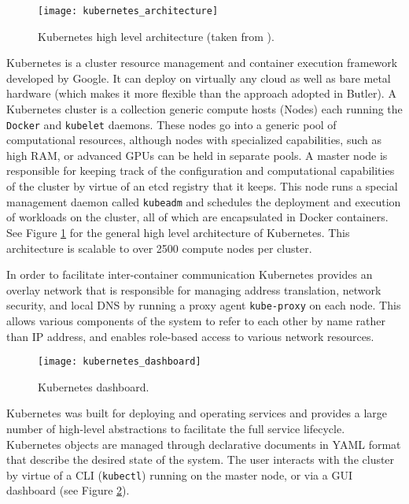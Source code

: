 \begin{figure}[H]
    \texttt{[image: kubernetes\_architecture]}
    \centering
    \caption {Kubernetes high level architecture (taken from \autocite{kubedoc}).}
    \label{fig:kubernetes_architecture}
\end{figure}

Kubernetes is a cluster resource management and container execution framework developed by Google. It can deploy on virtually any cloud as well as bare metal hardware (which makes it more flexible than the approach adopted in Butler). A Kubernetes cluster is a collection generic compute hosts (Nodes) each running the \texttt{Docker} and \texttt{kubelet} daemons. These nodes go into a generic pool of computational resources, although nodes with specialized capabilities, such as high RAM, or advanced GPUs can be held in separate pools. A master node is responsible for keeping track of the configuration and computational capabilities of the cluster by virtue of an etcd registry that it keeps. This node runs a special management daemon called \texttt{kubeadm} and schedules the deployment and execution of workloads on the cluster, all of which are encapsulated in Docker containers. See Figure \ref{fig:kubernetes_architecture} for the general high level architecture of Kubernetes. This architecture is scalable to over 2500 compute nodes per cluster\autocite{scalingkubernetes}.

In order to facilitate inter-container communication Kubernetes provides an overlay network that is responsible for managing address translation, network security, and local DNS by running a proxy agent \texttt{kube-proxy} on each node. This allows various components of the system to refer to each other by name rather than IP address, and enables role-based access to various network resources.

\begin{figure}[h]
    \texttt{[image: kubernetes\_dashboard]}
    \centering
    \caption {Kubernetes dashboard.}
    \label{fig:kubernetes_dashboard}
\end{figure}

Kubernetes was built for deploying and operating services and provides a large number of high-level abstractions to facilitate the full service lifecycle. Kubernetes objects are managed through declarative documents in YAML format that describe the desired state of the system. The user interacts with the cluster by virtue of a CLI (\texttt{kubectl}) running on the master node, or via a GUI dashboard (see Figure \ref{fig:kubernetes_dashboard}).

